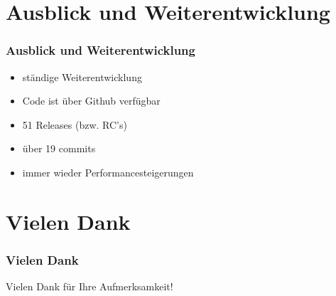 \documentclass[hyperref={pdfpagelabels=false}]{beamer}
\begin{document}
\section{Ausblick und Weiterentwicklung}
\begin{frame} 
\frametitle{Ausblick und Weiterentwicklung}

\begin{itemize}
	\item ständige Weiterentwicklung
	\item Code ist über Github verfügbar
	\item 51 Releases (bzw. RC's)
	\item über 19 commits
	\item immer wieder Performancesteigerungen
\end{itemize}

\end{frame}


\section{Vielen Dank}
\begin{frame} 
\frametitle{Vielen Dank}

\begin{center}
\Huge{Vielen Dank für Ihre Aufmerksamkeit!}
\end{center}

\end{frame}
\end{document}
